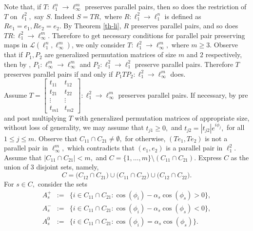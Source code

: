 \documentclass{amsart}
\theoremstyle{definition}
\theoremstyle{remark}
\numberwithin{equation}{section}
\begin{document}
Note that, if $T:\ell_1^n\to \ell_\infty^m$ preserves parallel pairs, then so does the restriction of $T$ on $\ell_1^2, $ say $S.$  Indeed $S=TR,$ where $R: \ell_1^2\to \ell_1^n$ is defined as $Re_1=e_1,Re_2=e_2. $ By Theorem \ref{th-li}, $R$ preserves parallel pairs, and so does $TR:\ell_1^2\to \ell_\infty^m.$  Therefore to get necessary conditions for parallel pair preserving maps in $\mathcal{L}(\ell_1^n,\ell_\infty^m)$, we only consider $T:\ell_1^2\to \ell_\infty^m,$ where $m\geq 3.$  %
Observe that if $P_1,P_2$ are generalized permutation matrices of size $m$ and $2$ respectively, then by \cite{LTWW}, $P_1:\ell_\infty^m\to \ell_\infty^m$ and $P_2:\ell_1^2\to \ell_1^2$ preserve parallel pairs. Therefore $T$ preserves parallel pairs if and only if $P_1TP_2:\ell_1^2\to \ell_\infty^m$ does. \\
Assume $T=\begin{bmatrix}
	t_{11}&t_{12}\\
	t_{21}&t_{22}\\
	\vdots &\vdots\\
	t_{m1}&t_{m2}
\end{bmatrix}:\ell_1^2\to \ell_\infty^m$ preserves parallel pairs. If necessary, by pre and post multiplying $T$ with generalized permutation matrices of appropriate size, without loss of generality, we may assume that $t_{j1}\geq 0,$ and $ t_{j2}=|t_{j2}|e^{i\phi_j},$ for all $1\leq j\leq m.$ Observe that  $C_{11}\cap C_{21}\neq \emptyset,$ for otherwise, $(Te_1,Te_2)$ is not a parallel pair in $\ell_\infty^m,$ which contradicts that  $(e_1,e_2)$ is a parallel pair in $\ell_1^2.$  Assume that $|C_{11}\cap C_{21}|<m,$ and  $C=\{1,\ldots,m\}\setminus(C_{11}\cap C_{21}).$ %
 Express $C$ as the union of $3$ disjoint sets, namely,   $$C= \Big(C_{12}\cap C_{21}\Big) \cup \Big(C_{11}\cap C_{22}\Big)\cup \Big(C_{12}\cap C_{22}\Big).$$ 	For $s\in C,$
 consider the sets 
\begin{eqnarray*}
A_s^+&:=&\{i\in  C_{11}\cap C_{21}:\cos(\phi_i)-\alpha_s \cos(\phi_s)>0\},\\
A_s^-&:=&\{i\in  C_{11}\cap C_{21}:\cos(\phi_i)-\alpha_s  \cos(\phi_s)<0\},\\
A_s^0&:=&\{i\in  C_{11}\cap C_{21}:\cos(\phi_i)=\alpha_s \cos(\phi_s)\}.
\end{eqnarray*} 
\end{document}
